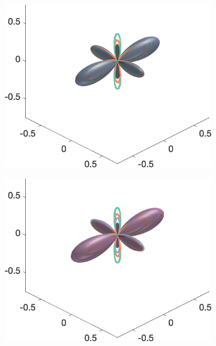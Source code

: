 \begin{figure}
{\begin{minipage}[c]{\textwidth}
\begin{subfigure}[]{0.245\textwidth}
  \end{subfigure}
  \begin{subfigure}[]{0.245\textwidth}
    \includegraphics[width=\textwidth]{figures/frf_experiment/threeperp_fod_3D_b_3000n_3}
  \end{subfigure}
  \begin{subfigure}[]{0.245\textwidth}
    \includegraphics[width=\textwidth]{figures/frf_experiment/threeperp_fod_3D_b_3000n_4_f1}
  \end{subfigure}
  \end{minipage}
}
\end{figure}
